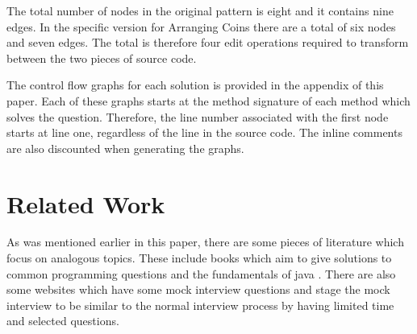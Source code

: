 \documentclass[10pt,twocolumn]{IEEEtran}
\begin{document}
\par The total number of nodes in the original pattern is eight and it contains nine edges. In the specific version for Arranging Coins there are a total of six nodes and seven edges. The total is therefore four edit operations required to transform between the two pieces of source code. 
\par The control flow graphs for each solution is provided in the appendix of this paper. Each of these graphs starts at the method signature of each method which solves the question. Therefore, the line number associated with the first node starts at line one, regardless of the line in the source code. The inline comments are also discounted when generating the graphs.
\section{Related Work}
As was mentioned earlier in this paper, there are some pieces of literature which focus on analogous topics. These include books which aim to give solutions to common programming questions \cite{mcdowell2015cracking} and the fundamentals of java \cite{markham2014java}\cite{aziz2012elements}. There are also some websites which have some mock interview questions and stage the mock interview to be similar to the normal interview process by having limited time and selected questions.
\end{document}
